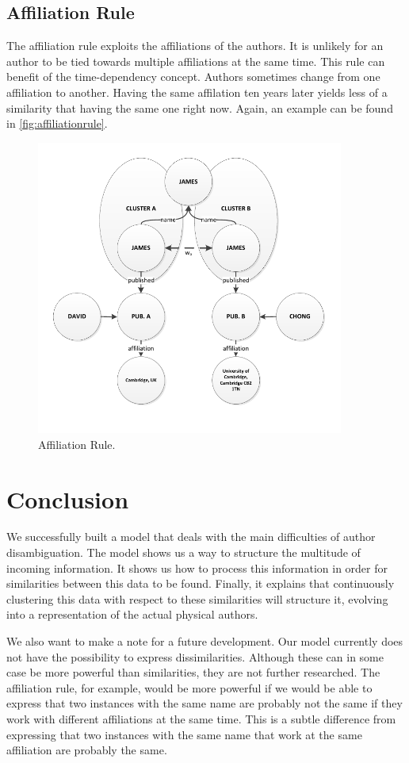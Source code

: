 \subsection{Affiliation Rule}

The affiliation rule exploits the affiliations of the authors. It is unlikely for an author to be tied towards multiple affiliations at the same time. This rule can benefit of the time-dependency concept. Authors sometimes change from one affiliation to another. Having the same affilation ten years later yields less of a similarity that having the same one right now. Again, an example can be found in \autoref{fig:affiliationrule}.

\begin{figure}[h!]
	\centering
		\includegraphics[width=0.9\textwidth]{fig/affiliationrule}
	\caption{Affiliation Rule.}
	\label{fig:affiliationrule}
\end{figure}

\section{Conclusion}

We successfully built a model that deals with the main difficulties of author disambiguation. The model shows us a way to structure the multitude of incoming information. It shows us how to process this information in order for similarities between this data to be found. Finally, it explains that continuously clustering this data with respect to these similarities will structure it, evolving into a representation of the actual physical authors.

We also want to make a note for a future development. Our model currently does not have the possibility to express dissimilarities. Although these can in some case be more powerful than similarities, they are not further researched. The affiliation rule, for example, would be more powerful if we would be able to express that two instances with the same name are probably not the same if they work with different affiliations at the same time. This is a subtle difference from expressing that two instances with the same name that work at the same affiliation are probably the same.